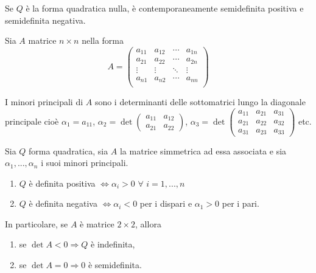 \begin{attbar}
	Se $Q$ è la forma quadratica nulla, è contemporaneamente semidefinita positiva e semidefinita negativa.
\end{attbar}

Sia $A$ matrice $n \times n$ nella forma
\begin{equation*}
	A= 
	\begin{pmatrix}
		a_{11}&a_{12} &\cdots &a_{1n} \\
		a_{21}&a_{22} &\cdots &a_{2n} \\
		\vdots&\vdots &\ddots &\vdots \\
		a_{n1}&a_{n2} &\cdots &a_{nn} \\
	\end{pmatrix}
\end{equation*}

I minori principali di $A$ sono i determinanti delle sottomatrici lungo la diagonale principale cioè $\alpha_1=a_{11}$, $\alpha_2=\det\begin{pmatrix}
	a_{11}&a_{12} \\
	a_{21}&a_{22}
\end{pmatrix}$, $\alpha_3=\det\begin{pmatrix}
	a_{11}&a_{21}&a_{31} \\
	a_{21}&a_{22}&a_{32} \\
	a_{31}&a_{23}&a_{33} 
\end{pmatrix}$
etc.


\begin{proposition}
	Sia $Q$ forma quadratica, sia $A$ la matrice simmetrica ad essa associata e sia $\alpha_1,...,\alpha_n$ i suoi minori principali.
	\begin{enumerate}
		\item $Q$ è definita positiva $\Leftrightarrow \alpha_i >0\,\, \forall \,\, i =1,...,n$
		\item $Q$ è definita negativa $\Leftrightarrow \alpha_i <0 $ per i dispari e $\alpha_1>0$ per i pari. 
	\end{enumerate}
	
	In particolare, se $A$ è matrice $2 \times 2$, allora
	\begin{enumerate}
		\item se $\det A <0 \Rightarrow Q$ è indefinita,
		\item se $\det A=0 \Rightarrow 0$ è semidefinita.
	\end{enumerate}
\end{proposition}


